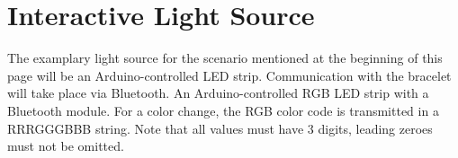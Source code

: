\chapter{Interactive Light Source}

The examplary light source for the scenario mentioned at the beginning of this page will be an Arduino-controlled LED strip. Communication with the bracelet will take place via Bluetooth. An Arduino-controlled RGB LED strip with a Bluetooth module. For a color change, the RGB color code is transmitted in a RRRGGGBBB string. Note that all values must have 3 digits, leading zeroes must not be omitted. 